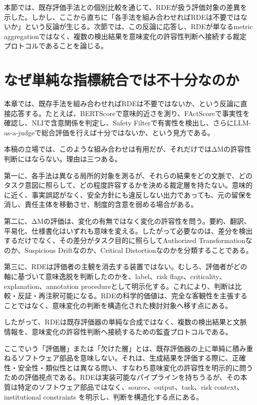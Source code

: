 \documentclass[
  a4paper]{ltjsarticle}
\begin{document}
本節では、既存評価手法との個別比較を通じて、RDEが扱う評価対象の差異を示した。しかし、ここから直ちに「各手法を組み合わせればRDEは不要ではないか」という反論が生じる。次節では、この反論に応答し、RDEが単なるmetric aggregationではなく、複数の検出結果を意味変化の許容性判断へ接続する裁定プロトコルであることを論じる。

\section{なぜ単純な指標統合では不十分なのか}\label{why-metric-aggregation-is-not-sufficient}

本章では、既存手法を組み合わせればRDEは不要ではないか、という反論に直接応答する。たとえば、BERTScoreで意味的近さを測り、FActScoreで事実性を確認し、NLIで含意関係を判定し、Safety
Filterで有害性を検出し、さらにLLM-as-a-judgeで総合評価を行えば十分ではないか、という見方である。

本稿の立場では、このような組み合わせは有用だが、それだけではΔMの許容性判断にはならない。理由は三つある。

第一に、各手法は異なる局所的対象を測るが、それらの結果をどの文脈で、どのタスク意図に照らして、どの程度許容するかを決める裁定層を持たない。意味的に近く、事実誤認がなく、安全方針にも違反しない出力であっても、元の留保を消し、責任主体を移動させ、制度的含意を弱める場合がある。

第二に、ΔMの評価は、変化の有無ではなく変化の許容性を問う。要約、翻訳、平易化、仕様書化はいずれも意味を変える。したがって必要なのは、差分を検出するだけでなく、その差分がタスク目的に照らしてAuthorized
Transformationなのか、Suspicious Driftなのか、Critical
Distortionなのかを分類することである。

第三に、RDEは評価者の主観を消去する装置ではない。むしろ、評価者がどの軸に基づいて意味逸脱を判断したのかを、label、risk
flags、criticality、explanation、annotation
procedureとして明示化する。これにより、判断は比較・反証・再注釈可能になる。RDEの科学的価値は、完全な客観性を主張することではなく、意味変化の判断を構造化された検討対象へ移す点にある。

したがって、RDEは既存評価器の単純な合成ではなく、複数の検出結果と文脈情報を、意味変化の許容性判断へ接続するための監査プロトコルである。

ここでいう「評価層」または「欠けた層」とは、既存評価器の上に単純に積み重ねるソフトウェア部品を意味しない。それは、生成結果を評価する際に、正確性・安全性・類似性とは異なる問い、すなわち意味変化の許容性を明示的に問うための評価視点である。RDEは実装可能なパイプラインを持ちうるが、その本質は特定のソフトウェア部品ではなく、source、output、task、risk
context、institutional constraints を明示し、判断を構造化する点にある。
\end{document}
